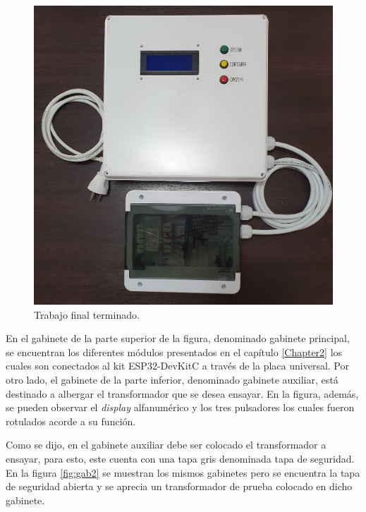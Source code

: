\begin{figure}[htpb]
	\centering
	\includegraphics[scale=0.12, angle=270]{./Figures/gab1.jpg}
	\caption{Trabajo final terminado.}
	\label{fig:gab1}
\end{figure}

En el gabinete de la parte superior de la figura, denominado gabinete principal, se encuentran los diferentes módulos presentados en el capítulo \ref{Chapter2} los cuales son conectados al kit ESP32-DevKitC a través de la placa universal. Por otro lado, el gabinete de la parte inferior, denominado gabinete auxiliar, está destinado a albergar el transformador que se desea ensayar. En la figura, además, se pueden observar el \textit{display} alfanumérico y los tres pulsadores los cuales fueron rotulados acorde a su función. 

Como se dijo, en el gabinete auxiliar debe ser colocado el transformador a ensayar, para esto, este cuenta con una tapa gris denominada tapa de seguridad. En la figura \ref{fig:gab2} se muestran los mismos gabinetes pero se encuentra la tapa de seguridad abierta y se aprecia un transformador de prueba colocado en dicho gabinete. 

